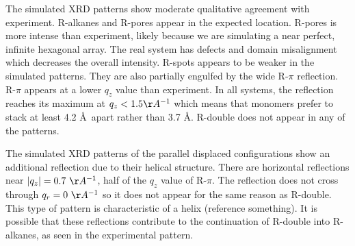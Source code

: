 \documentclass[journal=jpcbfk,manusciprt=article]{achemso}
\begin{document}
  The simulated XRD patterns show moderate qualitative agreement with experiment. R-alkanes and
  R-pores appear in the expected location. R-pores is more intense than experiment, likely
  because we are simulating a near perfect, infinite hexagonal array. The real system has 
  defects and domain misalignment which decreases the overall intensity.
  R-spots appears to be weaker in the simulated patterns. They are also partially engulfed by
  the wide R-$\pi$ reflection. R-$\pi$ appears at a lower $q_z$ value than experiment. In all
  systems, the reflection reaches its maximum at $q_z < 1.5 \AA^{-1}$ which means that monomers 
  prefer to stack at least 4.2 \AA~apart rather than 3.7 \AA. R-double does not appear in any
  of the patterns. 
  
  
  The simulated XRD patterns of the parallel displaced configurations show an additional
  reflection due to their helical structure. There are horizontal reflections near $|q_z|= 
  0.7~\AA^{-1}$, half of the $q_z$ value of R-$\pi$. The reflection does not cross through
  $q_r = 0~\AA^{-1}$ so it does not appear for the same reason as R-double. This type of pattern
  is characteristic of a helix (reference something).
  It is possible that these reflections contribute to the continuation of R-double into R-
  alkanes, as seen in the experimental pattern.
\end{document}
